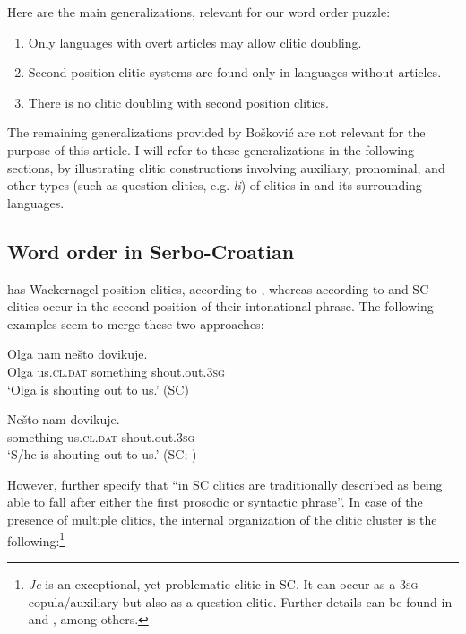 \documentclass[output=paper,
colorlinks,
citecolor=brown,
newtxmath
]{langscibook}
\begin{document}
Here are the main generalizations, relevant for our word order puzzle:
\begin{enumerate}
\item Only languages with overt articles may allow clitic doubling.\label{gen:1}
\item Second position clitic systems are found only in languages without articles.\label{gen:2}
\item There is no clitic doubling with second position clitics.\label{gen:3}
\end{enumerate}

\noindent The remaining generalizations provided by Bošković are not relevant for the purpose of this article.
I will refer to these generalizations in the following sections, by illustrating clitic constructions involving auxiliary, pronominal, and other types (such as question clitics, e.g. \textit{li}) of clitics in  and its surrounding languages.

\subsection{Word order in Serbo-Croatian}
\label{subsec:orderSC}
 has Wackernagel position clitics, according to \citet[217]{Franks.King2000}, whereas according to \citet{Boskovic2001} and \citet{Radanovic-Kocic1988,Radanovic-Kocic1996} SC clitics occur in the second position of their intonational phrase. The following examples seem to merge these two approaches:


\ea\label{ex:zivojinovic:17}
\gll Olga nam        nešto     dovikuje.\\
     Olga us.\textsc{cl.dat}  something shout.out.\textsc{3sg}\\
\glt `Olga is shouting out to us.'
\hfill (SC)
\z


\ea\label{ex:zivojinovic:18}
\gll Nešto     nam       dovikuje.\\
     something us.\textsc{cl.dat} shout.out.\textsc{3sg}\\
\glt `S/he is shouting out to us.'
\hfill (SC; \citealt[105]{Radanovic-Kocic1988})
\z

\noindent However, \citet[219]{Franks.King2000} further specify that ``in SC clitics are traditionally described as being able to fall after either the first prosodic or syntactic phrase''. In case of the presence of multiple clitics, the internal organization of the clitic cluster is the following:\footnote{\textit{Je} is an exceptional, yet problematic clitic in SC. It can occur as a \textsc{3sg} copula/auxiliary but also as a question clitic. Further details can be found in \citet{Franks2017} and \citet{Zivojinovicinpreparation}, among others.}
\end{document}
